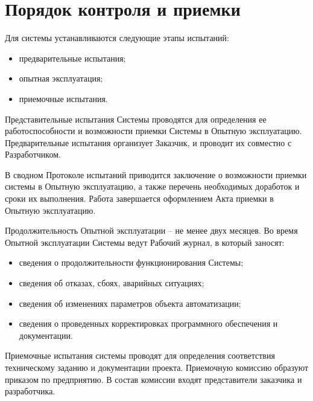 \section{Порядок контроля и приемки}
Для системы устанавливаются следующие этапы испытаний:
\begin{itemize}
  \item предварительные испытания;
  \item опытная эксплуатация;
  \item приемочные испытания.
\end{itemize}

Представительные испытания Системы проводятся для определения ее
работоспособности и возможности приемки Системы в Опытную эксплуатацию.
Предварительные испытания организует Заказчик, и проводит их совместно с
Разработчиком.

В сводном Протоколе испытаний приводится заключение о возможности приемки системы
в Опытную эксплуатацию, а также перечень необходимых доработок и сроки их
выполнения. Работа завершается оформлением Акта приемки в Опытную эксплуатацию.

Продолжительность Опытной эксплуатации -- не менее двух месяцев. Во время
Опытной эксплуатации Системы ведут Рабочий журнал, в который заносят:
\begin{itemize}
  \item сведения о продолжительности функционирования Системы;
  \item сведения об отказах, сбоях, аварийных ситуациях;
  \item сведения об изменениях параметров объекта автоматизации;
  \item сведения о проведенных корректировках программного обеспечения и
    документации.
\end{itemize}

Приемочные испытания системы проводят для определения соответствия техническому
заданию и документации проекта. Приемочную комиссию образуют приказом по
предприятию. В состав комиссии входят представители заказчика и разработчика.
